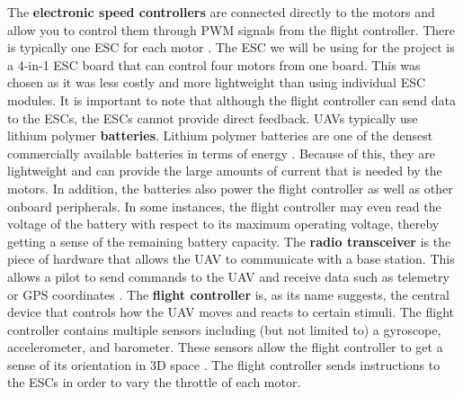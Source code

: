 \documentclass[english]{upeeei}
\begin{document}
\newline
The \textbf{electronic speed controllers} are connected directly to the motors and allow you to control them through PWM
signals from the flight controller. There is typically one ESC for each motor \cite{zimmerman2016}. The ESC we will be 
using for the project is a 4-in-1 ESC board that can control four motors from one board. This was chosen as it was less
costly and more lightweight than using individual ESC modules. It is important to note that although the flight controller
can send data to the ESCs, the ESCs cannot provide direct feedback.
\newline
\newline
UAVs typically use lithium polymer \textbf{batteries}. Lithium polymer batteries are one of the densest commercially
available batteries in terms of energy \cite{LiPoly}. Because of this, they are lightweight and can provide the large 
amounts of current that is needed by the motors. In addition, the batteries also power the flight controller as well as
other onboard peripherals. In some instances, the flight controller may even read the voltage of the battery with respect to
its maximum operating voltage, thereby getting a sense of the remaining battery capacity.
\newline
\newline
The \textbf{radio transceiver} is the piece of hardware that allows the UAV to communicate with a base station. This allows
a pilot to send commands to the UAV and receive data such as telemetry or GPS coordinates \cite{zimmerman2016}.
\newline
\newline
The \textbf{flight controller} is, as its name suggests, the central device that controls how the UAV moves and reacts to certain
stimuli. The flight controller contains multiple sensors including (but not limited to) a gyroscope, accelerometer, and
barometer. These sensors allow the flight controller to get a sense of its orientation in 3D space \cite{zimmerman2016}. The
flight controller sends instructions to the ESCs in order to vary the throttle of each motor.
\end{document}
